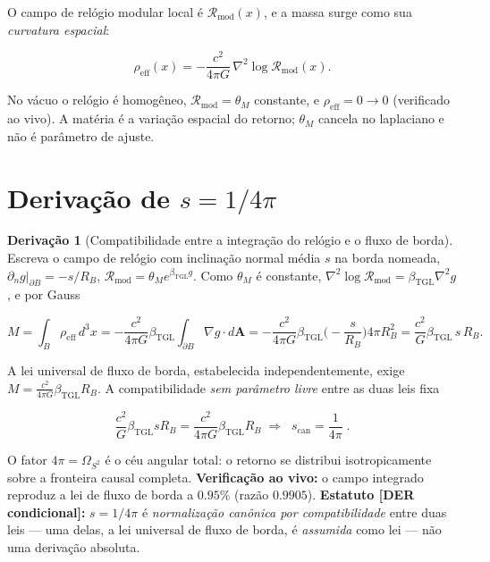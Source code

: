\documentclass[11pt]{article}
\newcommand{\bTGL}{\beta_{\mathrm{TGL}}}\newcommand{\Msun}{M_{\odot}}\newcommand{\TGL}{\mathrm{TGL}}
\theoremstyle{definition}\newtheorem{deriv}{Derivação}
\begin{document}
O campo de relógio modular local é $\mathcal{R}_{\mathrm{mod}}(x)$, e a massa surge como sua \emph{curvatura espacial}:

\begin{equation}\rho_{\mathrm{eff}}(x)=-\frac{c^2}{4\pi G}\,\nabla^2\log \mathcal{R}_{\mathrm{mod}}(x).\end{equation}

No vácuo o relógio é homogêneo, $\mathcal{R}_{\mathrm{mod}}=\theta_M$ constante, e $\rho_{\mathrm{eff}}=0\to 0$ (verificado ao vivo). A matéria é a variação espacial do retorno; $\theta_M$ cancela no laplaciano e não é parâmetro de ajuste.

\section{Derivação de $s=1/4\pi$}

\begin{deriv}[Compatibilidade entre a integração do relógio e o fluxo de borda]

Escreva o campo de relógio com inclinação normal média $s$ na borda nomeada, $\partial_n g|_{\partial B}=-s/R_B$, $\mathcal{R}_{\mathrm{mod}}=\theta_M e^{\bTGL g}$. Como $\theta_M$ é constante, $\nabla^2\log\mathcal{R}_{\mathrm{mod}}=\bTGL\nabla^2 g$, e por Gauss

\begin{equation}M=\int_B\rho_{\mathrm{eff}}\,d^3x=-\frac{c^2}{4\pi G}\bTGL\!\int_{\partial B}\!\nabla g\cdot d\mathbf{A}=-\frac{c^2}{4\pi G}\bTGL\Big(\!-\frac{s}{R_B}\Big)4\pi R_B^2=\frac{c^2}{G}\bTGL\,s\,R_B.\end{equation}

A lei universal de fluxo de borda, estabelecida independentemente, exige $M=\frac{c^2}{4\pi G}\bTGL R_B$. A compatibilidade \emph{sem parâmetro livre} entre as duas leis fixa

\begin{equation}\frac{c^2}{G}\bTGL s R_B=\frac{c^2}{4\pi G}\bTGL R_B\;\Longrightarrow\;\boxed{\;s_{\mathrm{can}}=\frac{1}{4\pi}\;}.\end{equation}

O fator $4\pi=\Omega_{S^2}$ é o céu angular total: o retorno se distribui isotropicamente sobre a fronteira causal completa. \textbf{Verificação ao vivo:} o campo integrado reproduz a lei de fluxo de borda a $0.95\%$ (razão $0.9905$). \textbf{Estatuto \textsf{[DER condicional]}:} $s=1/4\pi$ é \emph{normalização canônica por compatibilidade} entre duas leis --- uma delas, a lei universal de fluxo de borda, é \emph{assumida} como lei --- não uma derivação absoluta.\end{deriv}
\end{document}
